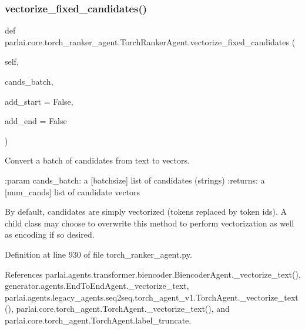 \mbox{\label{classparlai_1_1core_1_1torch__ranker__agent_1_1TorchRankerAgent_af2e2d618f056bb68089c7252fa07d07b}} 
\subsubsection{\texorpdfstring{vectorize\+\_\+fixed\+\_\+candidates()}{vectorize\_fixed\_candidates()}}
{\footnotesize\ttfamily def parlai.\+core.\+torch\+\_\+ranker\+\_\+agent.\+Torch\+Ranker\+Agent.\+vectorize\+\_\+fixed\+\_\+candidates (\begin{DoxyParamCaption}\item[{}]{self,  }\item[{}]{cands\+\_\+batch,  }\item[{}]{add\+\_\+start = {\ttfamily False},  }\item[{}]{add\+\_\+end = {\ttfamily False} }\end{DoxyParamCaption})}

\begin{DoxyVerb}Convert a batch of candidates from text to vectors.

:param cands_batch:
    a [batchsize] list of candidates (strings)
:returns:
    a [num_cands] list of candidate vectors

By default, candidates are simply vectorized (tokens replaced by token ids).
A child class may choose to overwrite this method to perform vectorization as
well as encoding if so desired.
\end{DoxyVerb}
 

Definition at line 930 of file torch\+\_\+ranker\+\_\+agent.\+py.



References parlai.\+agents.\+transformer.\+biencoder.\+Biencoder\+Agent.\+\_\+vectorize\+\_\+text(), generator.\+agents.\+End\+To\+End\+Agent.\+\_\+vectorize\+\_\+text, parlai.\+agents.\+legacy\+\_\+agents.\+seq2seq.\+torch\+\_\+agent\+\_\+v1.\+Torch\+Agent.\+\_\+vectorize\+\_\+text(), parlai.\+core.\+torch\+\_\+agent.\+Torch\+Agent.\+\_\+vectorize\+\_\+text(), and parlai.\+core.\+torch\+\_\+agent.\+Torch\+Agent.\+label\+\_\+truncate.



